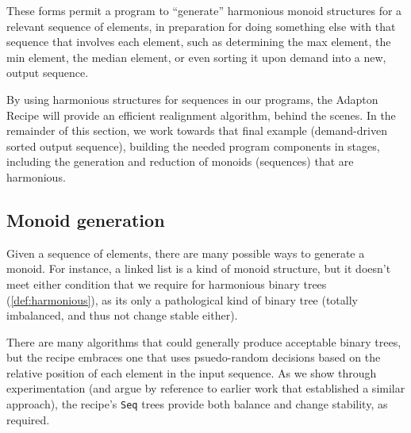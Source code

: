 \documentclass[11pt]{article}
\begin{document}
\begin{appendices}
\begin{itemize}
\end{itemize}

These forms permit a program to ``generate'' harmonious monoid structures for
a relevant sequence of elements, in preparation for doing something
else with that sequence that involves each element, such as
determining the max element, the min element, the median element, or
even sorting it upon demand into a new, output sequence.

By using harmonious structures for sequences in our programs, the Adapton Recipe will provide an efficient
realignment algorithm, behind the scenes.
%
In the remainder of this section, we work towards that final example
(demand-driven sorted output sequence), building the needed program components
in stages, including the generation and reduction of monoids (sequences) that are harmonious.

\subsection{Monoid generation}

Given a sequence of elements, there are many possible ways to generate a monoid.
%
For instance, a linked list is a kind of monoid structure, but it
doesn't meet either condition that we require for harmonious binary trees (\cref{def:harmonious}), as its
only a pathological kind of binary tree (totally imbalanced, and thus
not change stable either).

There are many algorithms that could generally produce acceptable
binary trees, but the recipe embraces one that uses psuedo-random
decisions based on the relative position of each element in the input
sequence.  As we show through experimentation (and argue by reference
to earlier work that established a similar approach), the recipe's
\texttt{Seq} trees provide both balance and change stability, as
required.

\newcommand{\CaptionToggle}[1]{} %


\end{appendices}
\end{document}
